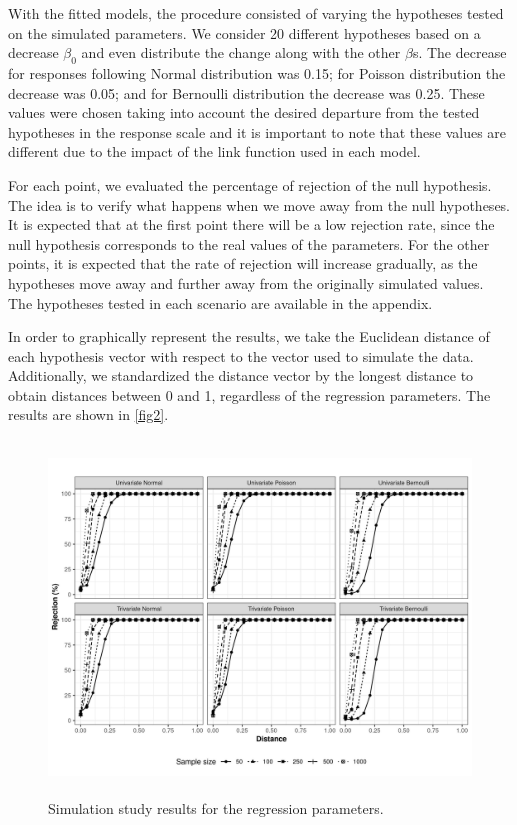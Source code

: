 \documentclass[USenglish]{article}
\theoremstyle{dgthm}
\theoremstyle{dgdef}
\begin{document}
With the fitted models, the procedure consisted of varying the hypotheses tested on the simulated parameters. We consider 20 different hypotheses based on a decrease $\beta_0$ and even distribute the change along with the other $\beta$s. The decrease for responses following Normal distribution was 0.15; for Poisson distribution the decrease was 0.05; and for Bernoulli distribution the decrease was 0.25. These values were chosen taking into account the desired departure from the tested hypotheses in the response scale and it is important to note that these values are different due to the impact of the link function used in each model.

For each point, we evaluated the percentage of rejection of the null hypothesis. The idea is to verify what happens when we move away from the null hypotheses. It is expected that at the first point there will be a low rejection rate, since the null hypothesis corresponds to the real values of the parameters. For the other points, it is expected that the rate of rejection will increase gradually, as the hypotheses move away and further away from the originally simulated values. The hypotheses tested in each scenario are available in the appendix.
 
In order to graphically represent the results, we take the Euclidean distance of each hypothesis vector with respect to the vector used to simulate the data. Additionally, we standardized the distance vector by the longest distance to obtain distances between 0 and 1, regardless of the regression parameters. The results are shown in \autoref{fig2}.

\begin{figure}[H]
\centering
\includegraphics[width=29.6pc,height=22.2pc]{FIGURES/FIGURE2.jpeg}
\caption{Simulation study results for the regression parameters.\label{fig2}}
\end{figure}
\end{document}
